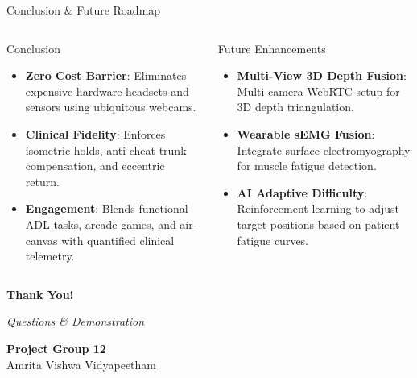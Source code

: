 \documentclass{beamer}
\begin{document}
\begin{frame}{Conclusion \& Future Roadmap}
\begin{columns}
\begin{block}{Conclusion}
\begin{itemize}
    \item \textbf{Zero Cost Barrier}: Eliminates expensive hardware headsets and sensors using ubiquitous webcams.
    \item \textbf{Clinical Fidelity}: Enforces isometric holds, anti-cheat trunk compensation, and eccentric return.
    \item \textbf{Engagement}: Blends functional ADL tasks, arcade games, and air-canvas with quantified clinical telemetry.
\end{itemize}
\end{block}

\begin{block}{Future Enhancements}
\begin{itemize}
    \item \textbf{Multi-View 3D Depth Fusion}: Multi-camera WebRTC setup for 3D depth triangulation.
    \item \textbf{Wearable sEMG Fusion}: Integrate surface electromyography for muscle fatigue detection.
    \item \textbf{AI Adaptive Difficulty}: Reinforcement learning to adjust target positions based on patient fatigue curves.
\end{itemize}
\end{block}
\end{columns}
\end{frame}

\begin{frame}
\begin{center}
    \Huge \textbf{Thank You!}
    
    \vspace{8mm}
    \Large \textit{Questions \& Demonstration}
    
    \vspace{6mm}
    \normalsize
    \textbf{Project Group 12}\\
    Amrita Vishwa Vidyapeetham
\end{center}
\end{frame}
\end{document}
